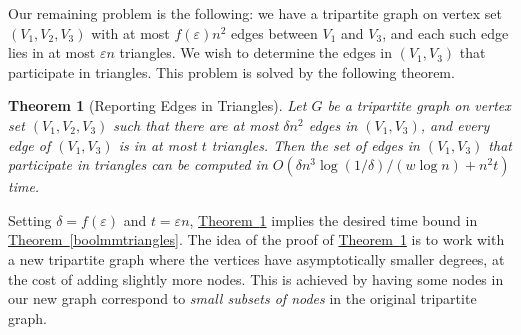 \documentclass[10pt]{article}
\newtheorem{theorem}{Theorem}[section]
\theoremstyle{definition}
\numberwithin{equation}{section}
\newcommand{\expref}[2]{\texorpdfstring{\hyperref[#2]{#1~\ref{#2}}}{#1~\ref{#2}}}
\newcommand{\eps}{\varepsilon}
\begin{document}
Our remaining problem is the following: we have a tripartite graph on vertex set $(V_1,V_2,V_3)$ with at most $f(\eps) n^2$ edges between $V_1$ and $V_3$, and each such edge lies in at most  $\eps n$ triangles. We wish to determine the edges in $(V_1,V_3)$ that participate in triangles. This problem is solved by the following theorem.

\begin{theorem}[Reporting Edges in Triangles]\label{sparseedgelisting} Let $G$ be a tripartite graph on vertex set $(V_1,V_2,V_3)$ such that there are at most $\delta n^2$ edges in $(V_1,V_3)$, and every edge of $(V_1,V_3)$ is in at most $t$ triangles. Then the set of edges in $(V_1,V_3)$ that participate in triangles can be computed in $O(\delta n^3 \log(1/\delta)/(w \log n) + n^2 t)$ time. \end{theorem}

Setting $\delta = f(\eps)$ and $t = \eps n$, \expref{Theorem}{sparseedgelisting} implies the desired time bound in \expref{Theorem}{boolmmtriangles}. The idea of the proof of \expref{Theorem}{sparseedgelisting} is to work with a new tripartite graph where the vertices have asymptotically smaller degrees, at the cost of adding slightly more nodes. This is achieved by having some nodes in our new graph correspond to \emph{small subsets of nodes} in the original tripartite graph.
\end{document}
